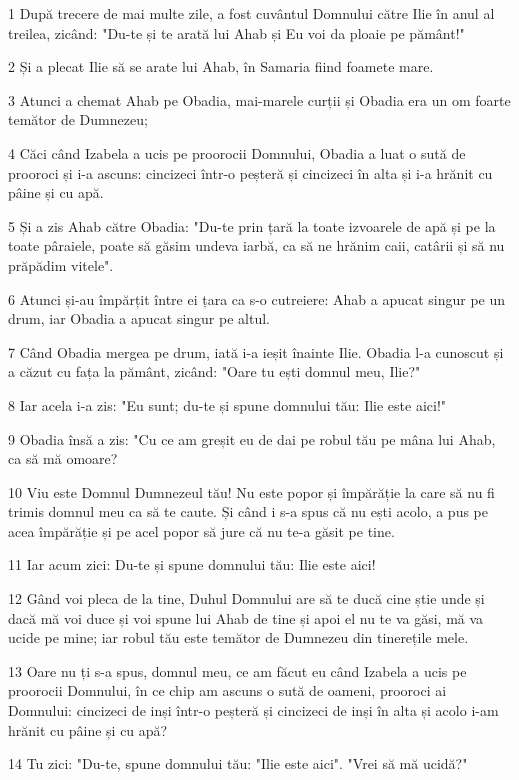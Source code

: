 \par 1 După trecere de mai multe zile, a fost cuvântul Domnului către Ilie în anul al treilea, zicând: "Du-te și te arată lui Ahab și Eu voi da ploaie pe pământ!"
\par 2 Și a plecat Ilie să se arate lui Ahab, în Samaria fiind foamete mare.
\par 3 Atunci a chemat Ahab pe Obadia, mai-marele curții și Obadia era un om foarte temător de Dumnezeu;
\par 4 Căci când Izabela a ucis pe proorocii Domnului, Obadia a luat o sută de prooroci și i-a ascuns: cincizeci într-o peșteră și cincizeci în alta și i-a hrănit cu pâine și cu apă.
\par 5 Și a zis Ahab către Obadia: "Du-te prin țară la toate izvoarele de apă și pe la toate pâraiele, poate să găsim undeva iarbă, ca să ne hrănim caii, catârii și să nu prăpădim vitele".
\par 6 Atunci și-au împărțit între ei țara ca s-o cutreiere: Ahab a apucat singur pe un drum, iar Obadia a apucat singur pe altul.
\par 7 Când Obadia mergea pe drum, iată i-a ieșit înainte Ilie. Obadia l-a cunoscut și a căzut cu fața la pământ, zicând: "Oare tu ești domnul meu, Ilie?"
\par 8 Iar acela i-a zis: "Eu sunt; du-te și spune domnului tău: Ilie este aici!"
\par 9 Obadia însă a zis: "Cu ce am greșit eu de dai pe robul tău pe mâna lui Ahab, ca să mă omoare?
\par 10 Viu este Domnul Dumnezeul tău! Nu este popor și împărăție la care să nu fi trimis domnul meu ca să te caute. Și când i s-a spus că nu ești acolo, a pus pe acea împărăție și pe acel popor să jure că nu te-a găsit pe tine.
\par 11 Iar acum zici: Du-te și spune domnului tău: Ilie este aici!
\par 12 Gând voi pleca de la tine, Duhul Domnului are să te ducă cine știe unde și dacă mă voi duce și voi spune lui Ahab de tine și apoi el nu te va găsi, mă va ucide pe mine; iar robul tău este temător de Dumnezeu din tinerețile mele.
\par 13 Oare nu ți s-a spus, domnul meu, ce am făcut eu când Izabela a ucis pe proorocii Domnului, în ce chip am ascuns o sută de oameni, prooroci ai Domnului: cincizeci de inși într-o peșteră și cincizeci de inși în alta și acolo i-am hrănit cu pâine și cu apă?
\par 14 Tu zici: "Du-te, spune domnului tău: "Ilie este aici". "Vrei să mă ucidă?"
